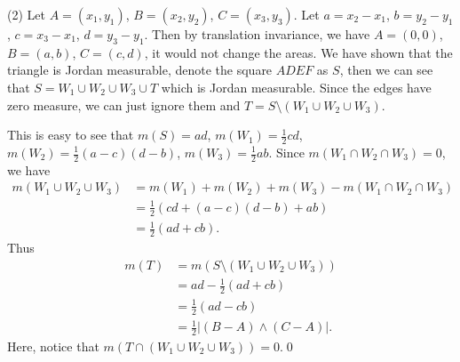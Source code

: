 \documentclass{book}
\theoremstyle{defstyle}
\theoremstyle{thmstyle}
\begin{document}
(2) Let $A = (x_1, y_1)$, $B = (x_2, y_2)$, $C = (x_3, y_3)$. Let $a = x_2 - x_1$, $b = y_2 - y_1$, $c = x_3 - x_1$, $d = y_3 - y_1$. Then by translation invariance, we have $A = (0, 0)$, $B = (a, b)$, $C = (c, d)$, it would not change the areas. We have shown that the triangle is Jordan measurable, denote the square $ADEF$ as $S$, then we can see that $S = W_1 \cup W_2 \cup W_3 \cup T$ which is Jordan measurable. Since the edges have zero measure, we can just ignore them and $T = S \setminus (W_1 \cup W_2 \cup W_3)$.

\vspace{-.5em}
\begin{center}
\end{center}
\vspace{-.5em}

This is easy to see that $m(S) = ad$, $m(W_1) = \frac{1}{2}cd$, $m(W_2) = \frac{1}{2}(a - c)(d - b)$, $m(W_3) = \frac{1}{2}ab$. Since $m(W_1 \cap W_2 \cap W_3) = 0$, we have
    \begin{align*}
        m(W_1 \cup W_2 \cup W_3)
        &= m(W_1) + m(W_2) + m(W_3) - m(W_1 \cap W_2 \cap W_3)\\
        &= \frac{1}{2}(cd + (a - c)(d - b) + ab)\\
        &= \frac{1}{2}(ad + cb).
    \end{align*}
Thus
    \begin{align*}
        m(T) &= m(S \setminus (W_1 \cup W_2 \cup W_3))\\
        &= ad - \frac{1}{2}(ad + cb)\\
        &= \frac{1}{2}(ad - cb)\\
        &= \frac{1}{2}|(B - A) \wedge (C - A)|.
    \end{align*}
Here, notice that $m(T \cap (W_1 \cup W_2 \cup W_3)) = 0$.\qed
\end{document}
